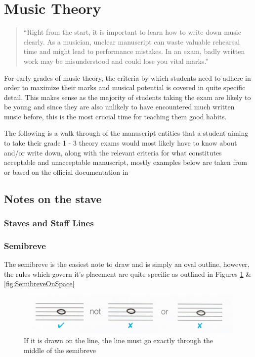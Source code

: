 \section{Music Theory}

\blockquote{``Right from the start, it is important to learn how to write down music clearly. As a musician, unclear manuscript can waste valuable rehearsal time and might lead to performance mistakes. In an exam, badly written work may be misunderstood and could lose you vital marks.'' \parencite{taylor1989ab}}

For early grades of music theory, the criteria by which students need to adhere in order to maximize their marks and musical potential is covered in quite specific detail. This makes sense as the majority of students taking the exam are likely to be young and since they are also unlikely to have encountered much written music before, this is the most crucial time for teaching them good habits.

The following is a walk through of the manuscript entities that a student aiming to take their grade 1 - 3 theory exams would most likely have to know about and/or write down, along with the relevant criteria for what constitutes acceptable and unacceptable manuscript, mostly examples below are taken from or based on the official documentation in \parencite{taylor2008music}


\subsection{Notes on the stave}

\subsubsection{Staves and Staff Lines}
\label{sec:music-theory-stave}

\subsubsection{Semibreve}

The semibreve is the easiest note to draw and is simply an oval outline, however, the rules which govern it's placement are quite specific as outlined in Figures \cref{fig:SemibreveOnLine} \& \cref{fig:SemibreveOnSpace}

\begin{figure}[h!]
  \includegraphics[width=\linewidth]{gfx/basic/semibreve-on-line.png}
  \centering
  \caption{If it is drawn on the line, the line must go exactly through the middle of the semibreve}
  \label{fig:SemibreveOnLine}
\end{figure}

